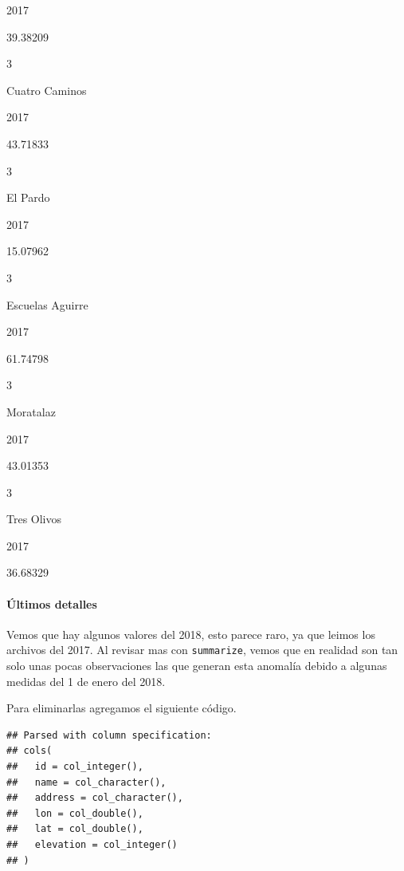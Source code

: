 \documentclass[]{book}
\newenvironment{Shaded}{\begin{snugshade}}{\end{snugshade}}
\newcommand{\DataTypeTok}[1]{\textcolor[rgb]{0.13,0.29,0.53}{#1}}
\newcommand{\KeywordTok}[1]{\textcolor[rgb]{0.13,0.29,0.53}{\textbf{#1}}}
\newcommand{\NormalTok}[1]{#1}
\newcommand{\OperatorTok}[1]{\textcolor[rgb]{0.81,0.36,0.00}{\textbf{#1}}}
\newcommand{\StringTok}[1]{\textcolor[rgb]{0.31,0.60,0.02}{#1}}
\let\oldparagraph\paragraph
\renewcommand{\paragraph}[1]{\oldparagraph{#1}\mbox{}}
\begin{document}
2017

39.38209

3

Cuatro Caminos

2017

43.71833

3

El Pardo

2017

15.07962

3

Escuelas Aguirre

2017

61.74798

3

Moratalaz

2017

43.01353

3

Tres Olivos

2017

36.68329

\hypertarget{ultimos-detalles}{%
\paragraph{Últimos detalles}\label{ultimos-detalles}}

Vemos que hay algunos valores del 2018, esto parece raro, ya que leimos
los archivos del 2017. Al revisar mas con \texttt{summarize}, vemos que
en realidad son tan solo unas pocas observaciones las que generan esta
anomalía debido a algunas medidas del 1 de enero del 2018.

Para eliminarlas agregamos el siguiente código.

\begin{Shaded}
\end{Shaded}

\begin{verbatim}
## Parsed with column specification:
## cols(
##   id = col_integer(),
##   name = col_character(),
##   address = col_character(),
##   lon = col_double(),
##   lat = col_double(),
##   elevation = col_integer()
## )
\end{verbatim}
\end{document}
